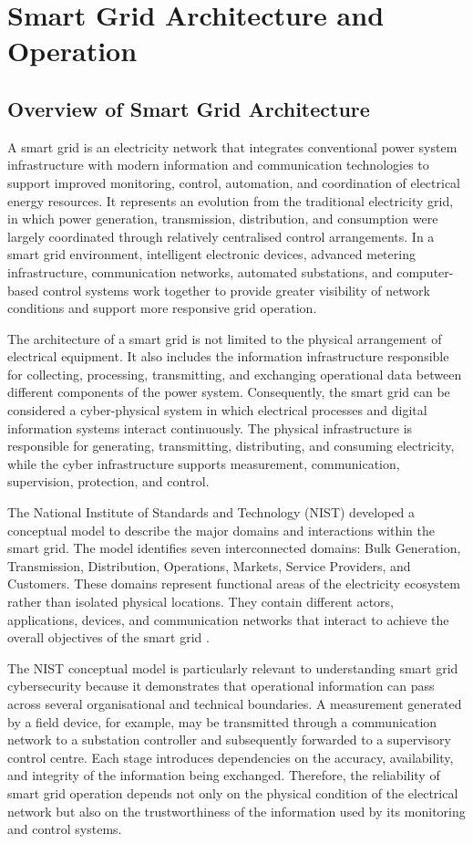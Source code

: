 \documentclass[12pt,a4paper]{report}
\begin{document}
\section{Smart Grid Architecture and Operation}

\subsection{Overview of Smart Grid Architecture}
A smart grid is an electricity network that integrates conventional power system infrastructure
with modern information and communication technologies to support improved monitoring, control,
automation, and coordination of electrical energy resources. It represents an evolution from
the traditional electricity grid, in which power generation, transmission, distribution, and
consumption were largely coordinated through relatively centralised control arrangements.
In a smart grid environment, intelligent electronic devices, advanced metering infrastructure,
communication networks, automated substations, and computer-based control systems work together
to provide greater visibility of network conditions and support more responsive grid operation.

The architecture of a smart grid is not limited to the physical arrangement of electrical
equipment. It also includes the information infrastructure responsible for collecting,
processing, transmitting, and exchanging operational data between different components of
the power system. Consequently, the smart grid can be considered a cyber-physical system in
which electrical processes and digital information systems interact continuously. The physical
infrastructure is responsible for generating, transmitting, distributing, and consuming
electricity, while the cyber infrastructure supports measurement, communication, supervision,
protection, and control.

The National Institute of Standards and Technology (NIST) developed a conceptual model to
describe the major domains and interactions within the smart grid. The model identifies seven
interconnected domains: Bulk Generation, Transmission, Distribution, Operations, Markets,
Service Providers, and Customers. These domains represent functional areas of the electricity
ecosystem rather than isolated physical locations. They contain different actors, applications,
devices, and communication networks that interact to achieve the overall objectives of the
smart grid \cite{nist2014framework}.

The NIST conceptual model is particularly relevant to understanding smart grid cybersecurity
because it demonstrates that operational information can pass across several organisational
and technical boundaries. A measurement generated by a field device, for example, may be
transmitted through a communication network to a substation controller and subsequently forwarded
to a supervisory control centre. Each stage introduces dependencies on the accuracy, availability,
and integrity of the information being exchanged. Therefore, the reliability of smart grid
operation depends not only on the physical condition of the electrical network but also on the
trustworthiness of the information used by its monitoring and control systems.
\end{document}
